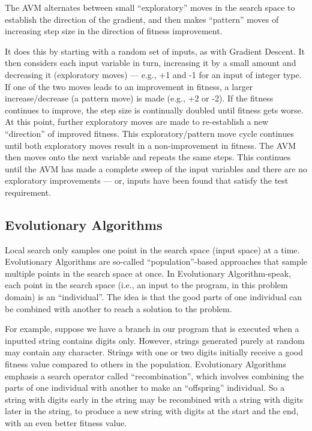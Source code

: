 The AVM alternates between small ``exploratory'' moves in the search space to
establish the direction of the gradient, and then makes ``pattern'' moves of
increasing step size in the direction of fitness improvement. 

It does this by starting with a random set of inputs, as with Gradient Descent.
It then considers each input variable in turn, increasing it by a small amount
and decreasing it (exploratory moves) --- e.g., +1 and -1 for an input of
integer type. If one of the two moves leads to an improvement in fitness, a
larger increase/decrease (a pattern move) is made (e.g., +2 or -2). If the
fitness continues to improve, the step size is continually doubled until fitness
gets worse. At this point, further exploratory moves are made to re-establish a
new ``direction'' of improved fitness. This exploratory/pattern move cycle
continues until both exploratory moves result in a non-improvement in fitness.
The AVM then moves onto the next variable and repeats the same steps. This
continues until the AVM has made a complete sweep of the input variables and
there are no exploratory improvements --- or, inputs have been found that
satisfy the test requirement.

\subsection{Evolutionary Algorithms}

Local search only samples one point in the search space (input space) at a time.
Evolutionary Algorithms are so-called ``population''-based approaches that
sample multiple points in the search space at once. In Evolutionary
Algorithm-speak, each point in the search space (i.e., an input to the program,
in this problem domain) is an ``individual''. The idea is that the good parts of
one individual can be combined with another to reach a solution to the problem. 

For example, suppose we have a branch in our program that is executed when a
inputted string contains digits only. However, strings generated purely at
random may contain any character. Strings with one or two digits initially
receive a good fitness value compared to others in the population. Evolutionary
Algorithms emphasis a search operator called ``recombination'', which involves
combining the parts of one individual with another to make an ``offspring''
individual. So a string with digits early in the string may be recombined with a
string with digits later in the string, to produce a new string with digits at
the start and the end, with an even better fitness value. 


